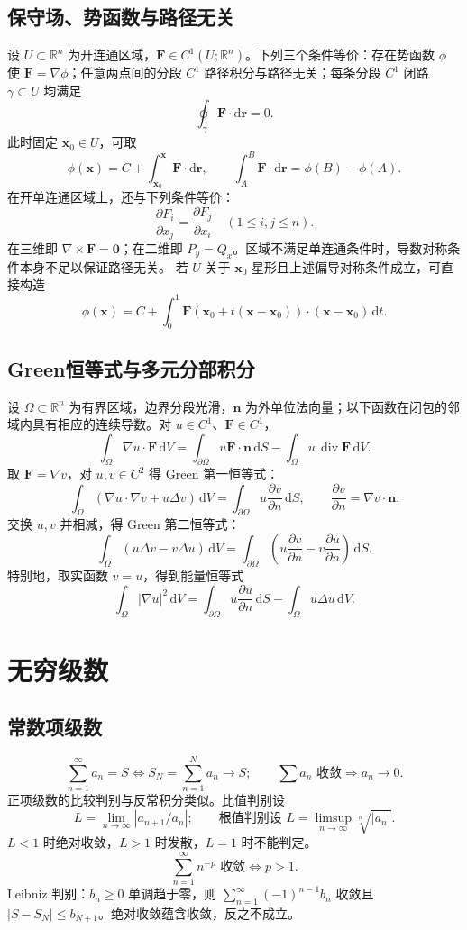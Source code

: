 \documentclass[../main.tex]{subfiles}
\begin{document}
\subsection{保守场、势函数与路径无关}
设 $U\subset\mathbb R^n$ 为开连通区域，$\bm F\in C^1(U;\mathbb R^n)$。下列三个条件等价：存在势函数 $\phi$ 使 $\bm F=\nabla\phi$；任意两点间的分段 $C^1$ 路径积分与路径无关；每条分段 $C^1$ 闭路 $\gamma\subset U$ 均满足
\[
\oint_\gamma\bm F\cdot\mathrm d\bm r=0.
\]
此时固定 $\bm x_0\in U$，可取
\[
\phi(\bm x)=C+\int_{\bm x_0}^{\bm x}\bm F\cdot\mathrm d\bm r,
\qquad
\int_A^B\bm F\cdot\mathrm d\bm r=\phi(B)-\phi(A).
\]
在开单连通区域上，还与下列条件等价：
\[
\frac{\partial F_i}{\partial x_j}
=\frac{\partial F_j}{\partial x_i}\quad(1\le i,j\le n).
\]
在三维即 $\nabla\times\bm F=\bm0$；在二维即 $P_y=Q_x$。区域不满足单连通条件时，导数对称条件本身不足以保证路径无关。
若 $U$ 关于 $\bm x_0$ 星形且上述偏导对称条件成立，可直接构造
\[
\phi(\bm x)=C+\int_0^1
\bm F(\bm x_0+t(\bm x-\bm x_0))\cdot(\bm x-\bm x_0)\,\mathrm dt.
\]
\subsection{Green恒等式与多元分部积分}
设 $\Omega\subset\mathbb R^n$ 为有界区域，边界分段光滑，$\bm n$ 为外单位法向量；以下函数在闭包的邻域内具有相应的连续导数。对 $u\in C^1$、$\bm F\in C^1$，
\[
\int_\Omega\nabla u\cdot\bm F\,\mathrm dV
=\int_{\partial\Omega}u\bm F\cdot\bm n\,\mathrm dS
-\int_\Omega u\,\operatorname{div}\bm F\,\mathrm dV.
\]
取 $\bm F=\nabla v$，对 $u,v\in C^2$ 得 Green 第一恒等式：
\[
\int_\Omega(\nabla u\cdot\nabla v+u\Delta v)\,\mathrm dV
=\int_{\partial\Omega}u\frac{\partial v}{\partial n}\,\mathrm dS,
\qquad\frac{\partial v}{\partial n}=\nabla v\cdot\bm n.
\]
交换 $u,v$ 并相减，得 Green 第二恒等式：
\[
\int_\Omega(u\Delta v-v\Delta u)\,\mathrm dV
=\int_{\partial\Omega}
\left(u\frac{\partial v}{\partial n}-v\frac{\partial u}{\partial n}\right)\,\mathrm dS.
\]
特别地，取实函数 $v=u$，得到能量恒等式
\[
\int_\Omega|\nabla u|^2\,\mathrm dV
=\int_{\partial\Omega}u\frac{\partial u}{\partial n}\,\mathrm dS
-\int_\Omega u\Delta u\,\mathrm dV.
\]
\section{无穷级数}
\subsection{常数项级数}
\[
\sum_{n=1}^\infty a_n=S\iff S_N=\sum_{n=1}^Na_n\to S;
\qquad \sum a_n\text{ 收敛}\Longrightarrow a_n\to0.
\]
正项级数的比较判别与反常积分类似。比值判别设
\[
L=\lim_{n\to\infty}|a_{n+1}/a_n|;
\qquad\text{根值判别设 }L=\limsup_{n\to\infty}\sqrt[n]{|a_n|}.
\]
$L<1$ 时绝对收敛，$L>1$ 时发散，$L=1$ 时不能判定。
\[
\sum_{n=1}^\infty n^{-p}\text{ 收敛}\iff p>1.
\]
Leibniz 判别：$b_n\ge0$ 单调趋于零，则 $\sum_{n=1}^\infty(-1)^{n-1}b_n$ 收敛且 $|S-S_N|\le b_{N+1}$。绝对收敛蕴含收敛，反之不成立。
\end{document}
